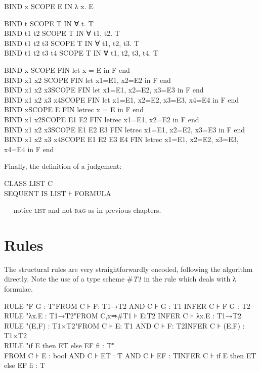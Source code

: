 \begin{japeish}
BIND x SCOPE E IN λ x. E

BIND t SCOPE T IN ∀ t. T\\
BIND t1 t2 SCOPE T IN ∀ t1, t2. T\\
BIND t1 t2 t3 SCOPE T IN ∀ t1, t2, t3. T\\
BIND t1 t2 t3 t4 SCOPE T IN ∀ t1, t2, t3, t4. T
\end{japeish}
\begin{japeish}
BIND x \tab SCOPE F\tab IN let x = E in F end\\
BIND x1 x2 \tab SCOPE F\tab IN let x1=E1, x2=E2 in F end\\
BIND x1 x2 x3\tab SCOPE F\tab IN let x1=E1, x2=E2, x3=E3 in F end\\
BIND x1 x2 x3 x4\tab SCOPE F\tab IN let x1=E1, x2=E2, x3=E3, x4=E4 in F end\\
BIND x\tab SCOPE E F\tab IN letrec x = E in F end\\
BIND x1 x2\tab SCOPE E1 E2 F\tab IN letrec x1=E1, x2=E2 in F end\\
BIND x1 x2 x3\tab SCOPE E1 E2 E3 F\tab IN letrec x1=E1, x2=E2, x3=E3 in F end\\
BIND x1 x2 x3 x4\tab SCOPE E1 E2 E3 E4 F\tab IN letrec x1=E1, x2=E2, x3=E3, x4=E4 in F end
\end{japeish}
Finally, the definition of a judgement:
\begin{japeish}
CLASS LIST C\\
SEQUENT IS LIST ⊦ FORMULA
\end{japeish}
--- notice \textsc{list} and not \textsc{bag} as in previous chapters.

\section{Rules}

The structural rules are very straightforwardly encoded, following the algorithm directly. Note the use of a type scheme \#\textit{T1} in the rule which deals with λ formulae.
\begin{japeish}
RULE "F G : T"\tab FROM C ⊦ F: T1→T2 AND C ⊦ G : T1 \tab INFER C ⊦ F G : T2\\
RULE "λx.E : T1→T2"\tab FROM C,x⇒\#T1 ⊦ E:T2 \tab INFER C ⊦ λx.E : T1→T2\\
RULE "(E,F) : T1×T2"\tab FROM C ⊦ E: T1 AND C ⊦ F: T2\tab INFER C ⊦ (E,F) : T1×T2\\
RULE "if E then ET else EF fi : T"\\
\tab FROM C ⊦ E : bool AND C ⊦ ET : T AND C ⊦ EF : T\tab INFER C ⊦ if E then ET else EF fi : T
\end{japeish}

